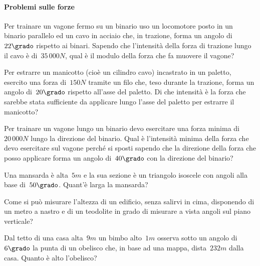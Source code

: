 \paragraph{Problemi sulle forze}

\begin{multicols}{2}
 \begin{esercizio}[\Ast]
\label{ese:G.51}
Per trainare un vagone fermo su un binario uso un locomotore posto in un binario parallelo ed un cavo in acciaio che, in trazione,
forma un angolo di~$22\grado$ rispetto ai binari. Sapendo che l'intensità della forza di trazione lungo il cavo è di~$35\,000\unit{N}$,
qual è il modulo della forza che fa muovere il vagone?
\end{esercizio}

\begin{esercizio}[\Ast]
\label{ese:G.52}
Per estrarre un manicotto (cioè un cilindro cavo) incastrato in un paletto, esercito una forza di~$150\unit{N}$ tramite un filo che,
teso durante la trazione, forma un angolo di~$20\grado$ rispetto all'asse del paletto. Di che intensità è la forza che sarebbe stata
sufficiente da applicare lungo l'asse del paletto per estrarre il manicotto?
\end{esercizio}

\begin{esercizio}[\Ast]
\label{ese:G.53}
Per trainare un vagone lungo un binario devo esercitare una forza minima di~$20\,000\unit{N}$ lungo la direzione del binario.
Qual è l'intensità minima della forza che devo esercitare sul vagone perché si sposti sapendo che la direzione della forza che posso
applicare forma un angolo di~$40\grado$ con la direzione del binario?
\end{esercizio}

\begin{esercizio}[\Ast]
\label{ese:G.54}
Una mansarda è alta~$5\unit{m}$ e la sua sezione è un triangolo isoscele con angoli alla base di~$50\grado$. Quant'è larga la mansarda?
\end{esercizio}

\begin{esercizio}
\label{ese:G.55}
Come si può misurare l'altezza di un edificio, senza salirvi in cima, disponendo di un metro a nastro e di un teodolite in grado di
misurare a vista angoli sul piano verticale?
\end{esercizio}

\begin{esercizio}[\Ast]
\label{ese:G.56}
Dal tetto di una casa alta~$9\unit{m}$ un bimbo alto~$1\unit{m}$ osserva sotto un angolo di~$6\grado$ la punta di un obelisco che,
in base ad una mappa, dista~$232\unit{m}$ dalla casa. Quanto è alto l'obelisco?
\end{esercizio}


\end{multicols}
